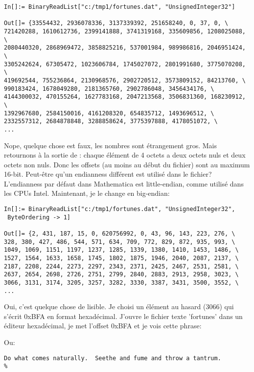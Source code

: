 \begin{lstlisting}[style=custommath]
In[]:= BinaryReadList["c:/tmp1/fortunes.dat", "UnsignedInteger32"]

Out[]= {33554432, 2936078336, 3137339392, 251658240, 0, 37, 0, \
721420288, 1610612736, 2399141888, 3741319168, 335609856, 1208025088, \
2080440320, 2868969472, 3858825216, 537001984, 989986816, 2046951424, \
3305242624, 67305472, 1023606784, 1745027072, 2801991680, 3775070208, \
419692544, 755236864, 2130968576, 2902720512, 3573809152, 84213760, \
990183424, 1678049280, 2181365760, 2902786048, 3456434176, \
4144300032, 470155264, 1627783168, 2047213568, 3506831360, 168230912, \
1392967680, 2584150016, 4161208320, 654835712, 1493696512, \
2332557312, 2684878848, 3288858624, 3775397888, 4178051072, \
...
\end{lstlisting}

Nope, quelque chose est faux, les nombres sont étrangement gros.
Mais retournons à la sortie de \IT{od}: chaque élément de 4 octets a deux octets nuls
et deux octets non nuls.
Donc les offsets (au moins au début du fichier) sont au maximum 16-bit.
Peut-être qu'un endianness différent est utilisé dans le fichier?
L'endianness par défaut dans Mathematica est little-endian, comme utilisé dans les
CPUs Intel.
Maintenant, je le change en big-endian:

\begin{lstlisting}[style=custommath]
In[]:= BinaryReadList["c:/tmp1/fortunes.dat", "UnsignedInteger32", 
 ByteOrdering -> 1]

Out[]= {2, 431, 187, 15, 0, 620756992, 0, 43, 96, 143, 223, 276, \
328, 380, 427, 486, 544, 571, 634, 709, 772, 829, 872, 935, 993, \
1049, 1069, 1151, 1197, 1237, 1285, 1339, 1380, 1410, 1453, 1486, \
1527, 1564, 1633, 1658, 1745, 1802, 1875, 1946, 2040, 2087, 2137, \
2187, 2208, 2244, 2273, 2297, 2343, 2371, 2425, 2467, 2531, 2581, \
2637, 2654, 2698, 2726, 2751, 2799, 2840, 2883, 2913, 2958, 3023, \
3066, 3131, 3174, 3205, 3257, 3282, 3330, 3387, 3431, 3500, 3552, \
...
\end{lstlisting}

Oui, c'est quelque chose de lisible.
Je choisi un élément au hasard (3066) qui s'écrit 0xBFA en format hexadécimal.
J'ouvre le fichier texte 'fortunes' dans un éditeur hexadécimal, je met l'offset
0xBFA et je vois cette phrase:



Ou:

\begin{lstlisting}
Do what comes naturally.  Seethe and fume and throw a tantrum.
%
\end{lstlisting}

